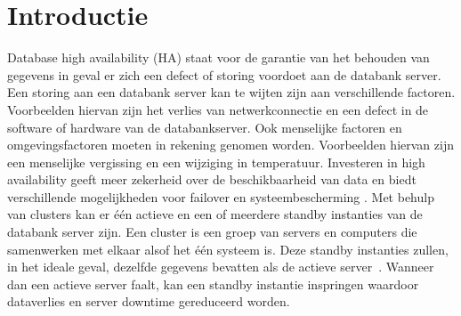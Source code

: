 
\section{Introductie} %
\label{sec:introductie}
Database high availability (HA) staat voor de garantie van het behouden van gegevens in geval er zich een defect of storing voordoet aan de databank  server. Een storing aan een databank server kan te wijten zijn aan verschillende factoren. Voorbeelden hiervan zijn het verlies van netwerkconnectie en een defect in de software of hardware van de databankserver. Ook menselijke factoren en omgevingsfactoren moeten in rekening genomen worden. Voorbeelden hiervan zijn een menselijke vergissing en een wijziging in temperatuur. Investeren in high availability geeft meer zekerheid over de beschikbaarheid van data en biedt verschillende mogelijkheden voor failover en systeembescherming \autocite{IBM1}. Met behulp van clusters kan er één actieve en een of meerdere standby instanties van de databank server zijn. Een cluster is een groep van servers en computers die samenwerken met elkaar alsof het één systeem is. Deze standby instanties zullen, in het ideale geval, dezelfde gegevens bevatten als de actieve server~\autocite{BDQ}. Wanneer dan een actieve server faalt, kan een standby instantie inspringen waardoor dataverlies en server downtime gereduceerd worden.




